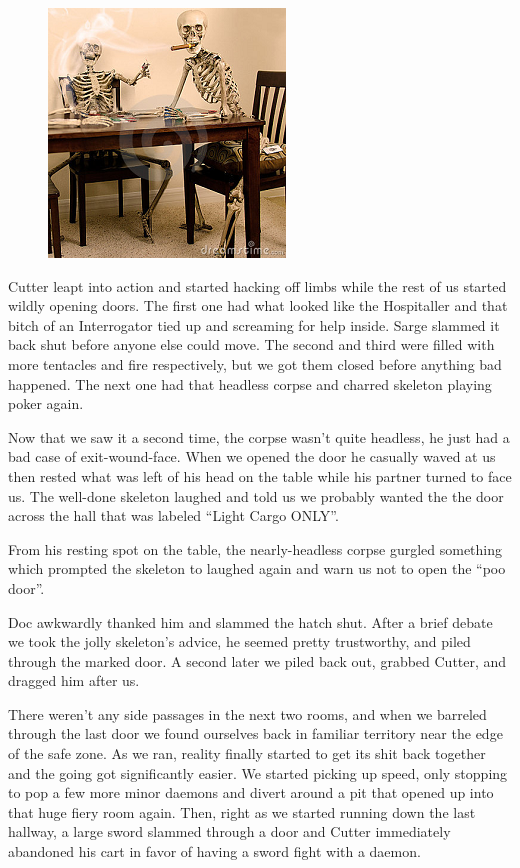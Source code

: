 \begin{figure}
	\begin{center}
		\includegraphics[width=\figwidth]{pics/7/34.png}
	\end{center}
\end{figure}
Cutter leapt into action and started hacking off limbs while the rest of us started wildly opening doors. 
The first one had what looked like the Hospitaller and that bitch of an Interrogator tied up and screaming for help inside. 
Sarge slammed it back shut before anyone else could move. 
The second and third were filled with more tentacles and fire respectively, but we got them closed before anything bad happened. 
The next one had that headless corpse and charred skeleton playing poker again.

Now that we saw it a second time, the corpse wasn’t quite headless, he just had a bad case of exit-wound-face. 
When we opened the door he casually waved at us then rested what was left of his head on the table while his partner turned to face us. 
The well-done skeleton laughed and told us we probably wanted the the door across the hall that was labeled “Light Cargo ONLY”. 

From his resting spot on the table, the nearly-headless corpse gurgled something which prompted the skeleton to laughed again and warn us not to open the “poo door”. 

Doc awkwardly thanked him and slammed the hatch shut. 
After a brief debate we took the jolly skeleton’s advice, he seemed pretty trustworthy, and piled through the marked door. 
A second later we piled back out, grabbed Cutter, and dragged him after us.

There weren’t any side passages in the next two rooms, and when we barreled through the last door we found ourselves back in familiar territory near the edge of the safe zone. 
As we ran, reality finally started to get its shit back together and the going got significantly easier. 
We started picking up speed, only stopping to pop a few more minor daemons and divert around a pit that opened up into that huge fiery room again. 
Then, right as we started running down the last hallway, a large sword slammed through a door and Cutter immediately abandoned his cart in favor of having a sword fight with a daemon.

